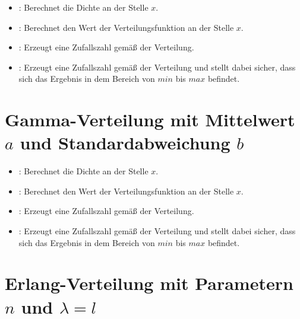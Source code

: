 \begin{itemize}

\item
{}:
Berechnet die Dichte an der Stelle $x$.

\item
{}:
Berechnet den Wert der Verteilungsfunktion an der Stelle $x$.

\item
{}:
Erzeugt eine Zufallszahl gemäß der Verteilung.

\item
{}:
Erzeugt eine Zufallszahl gemäß der Verteilung und stellt dabei sicher, dass sich das Ergebnis in dem Bereich von $min$ bis $max$ befindet.

\end{itemize}



\section{Gamma-Verteilung mit Mittelwert \texorpdfstring{$a$}{a} und Standardabweichung \texorpdfstring{$b$}{b}}

\begin{itemize}

\item
{}:
Berechnet die Dichte an der Stelle $x$.

\item
{}:
Berechnet den Wert der Verteilungsfunktion an der Stelle $x$.

\item
{}:
Erzeugt eine Zufallszahl gemäß der Verteilung.

\item
{}:
Erzeugt eine Zufallszahl gemäß der Verteilung und stellt dabei sicher, dass sich das Ergebnis in dem Bereich von $min$ bis $max$ befindet.

\end{itemize}



\section{Erlang-Verteilung mit Parametern \texorpdfstring{$n$}{n} und \texorpdfstring{$\lambda=l$}{l}}

